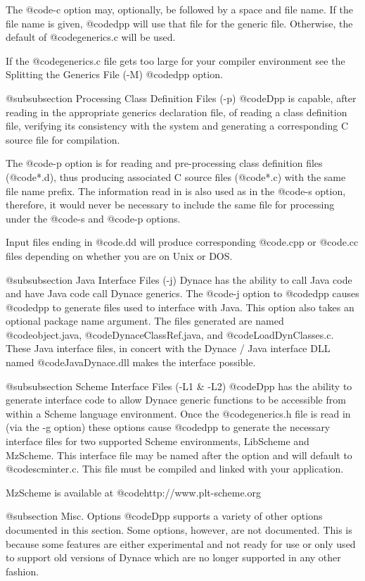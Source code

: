The @code{-c} option may, optionally, be followed by a space and file
name.  If the file name is given, @code{dpp} will use that file for the
generic file.  Otherwise, the default of @code{generics.c} will be used.

If the @code{generics.c} file gets too large for your compiler environment
see the Splitting the Generics File (-M) @code{dpp} option.

@subsubsection Processing Class Definition Files (-p)
@code{Dpp} is capable, after reading in the appropriate generics
declaration file, of reading a class definition file, verifying
its consistency with the system and generating a corresponding
C source file for compilation.

The @code{-p} option is for reading and pre-processing class
definition files (@code{*.d}), thus producing associated
C source files (@code{*.c}) with the same file name prefix.
The information read in is also used as in the @code{-s} option,
therefore, it would never be necessary to include the same
file for processing under the @code{-s} and @code{-p} options.

Input files ending in @code{.dd} will produce corresponding
@code{.cpp} or @code{.cc} files depending on whether you are
on Unix or DOS.

@subsubsection Java Interface Files (-j)
Dynace has the ability to call Java code and have Java code
call Dynace generics.  The @code{-j} option to @code{dpp}
causes @code{dpp} to generate files used to interface with Java.
This option also takes an optional package name argument.
The files generated are named @code{object.java},
@code{DynaceClassRef.java}, and @code{LoadDynClasses.c}.
These Java interface files, in concert with the Dynace / Java interface DLL
named @code{JavaDynace.dll} makes the interface possible.

@subsubsection Scheme Interface Files (-L1 & -L2)
@code{Dpp} has the ability to generate interface code to allow Dynace
generic functions to be accessible from within a Scheme language
environment.  Once the @code{generics.h} file is read in (via the -g
option) these options cause @code{dpp} to generate the necessary
interface files for two supported Scheme environments, LibScheme and
MzScheme.  This interface file may be named after the option and
will default to @code{scminter.c}.  This file must be compiled and
linked with your application.

MzScheme is available at
@code{http://www.plt-scheme.org}

@subsection Misc. Options
@code{Dpp} supports a variety of other options documented in this
section.  Some options, however, are not documented.  This is because
some features are either experimental and not ready for use or only used
to support old versions of Dynace which are no longer supported in any
other fashion.

